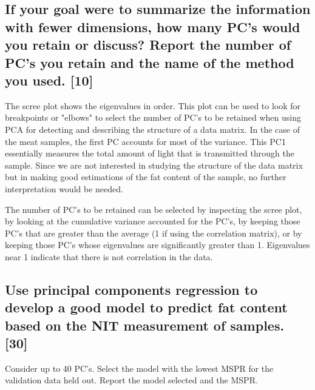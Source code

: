 \documentclass[letterpaper]{article}
\begin{document}
\subsection {If your goal were to summarize the information with fewer dimensions, how many PC's would you retain or discuss? Report the number of PC's you retain and the name of the method you used. [10]}

The scree plot shows the eigenvalues in order. This plot can be used to look for breakpoints or "elbows" to select the number of PC's to be retained when using PCA for detecting and describing the structure of a data matrix. In the case of the meat samples, the first PC accounts for most of the variance. This PC1 essentially measures the total amount of light that is transmitted through the sample. Since we are not interested in studying the structure of the data matrix but in making good estimations of the fat content of the sample, no further interpretation would be needed.

The number of PC's to be retained can be selected by inspecting the scree plot, by looking at the cumulative variance accounted for the PC's, by keeping those PC's that are greater than the average (1 if using the correlation matrix), or by keeping those PC's whose eigenvalues are significantly greater than 1. Eigenvalues near 1 indicate that there is not correlation  in the data.

\subsection {Use principal components regression to develop a good model to predict fat content based on the NIT measurement of samples. [30]}

Consider up to 40 PC's. Select the model with the lowest MSPR for the validation data held out. Report the model selected and the MSPR.
\end{document}
